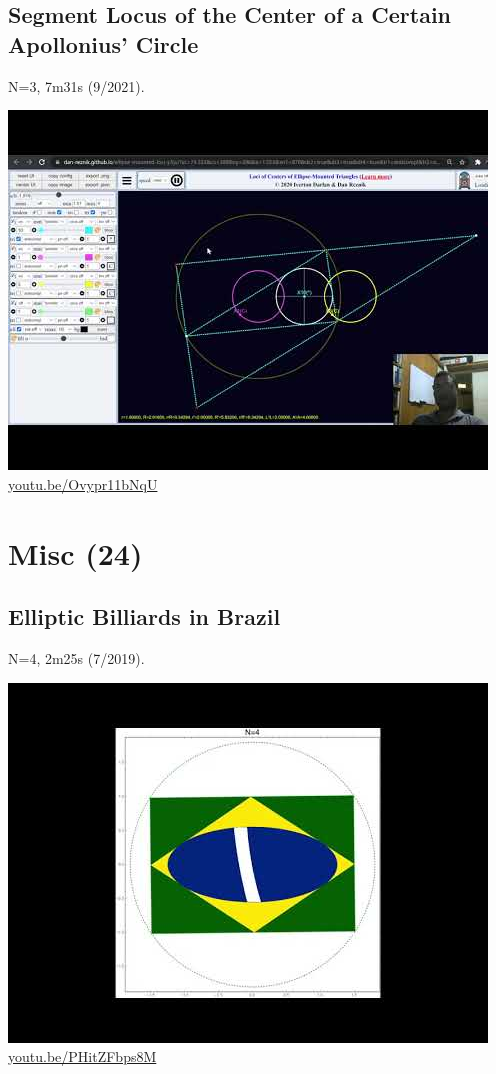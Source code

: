 \documentclass[12pt]{amsart}
\begin{document}
\subsection{Segment Locus of the Center of a Certain Apollonius' Circle}
\label{vid:Ovypr11bNqU}
\noindent N=3, 7m31s (9/2021). 
\begin{center}\includegraphics[width=.5\textwidth]{pics/Ovypr11bNqU.jpg} \\ 
\href{https://youtu.be/Ovypr11bNqU}{\url{youtu.be/Ovypr11bNqU}}\end{center}
% 

\section{Misc (24)}

\subsection{Elliptic Billiards in Brazil}
\label{vid:PHitZFbps8M}
\noindent N=4, 2m25s (7/2019). 
\begin{center}\includegraphics[width=.5\textwidth]{pics/PHitZFbps8M.jpg} \\ 
\href{https://youtu.be/PHitZFbps8M}{\url{youtu.be/PHitZFbps8M}}\end{center}
% 
\end{document}

